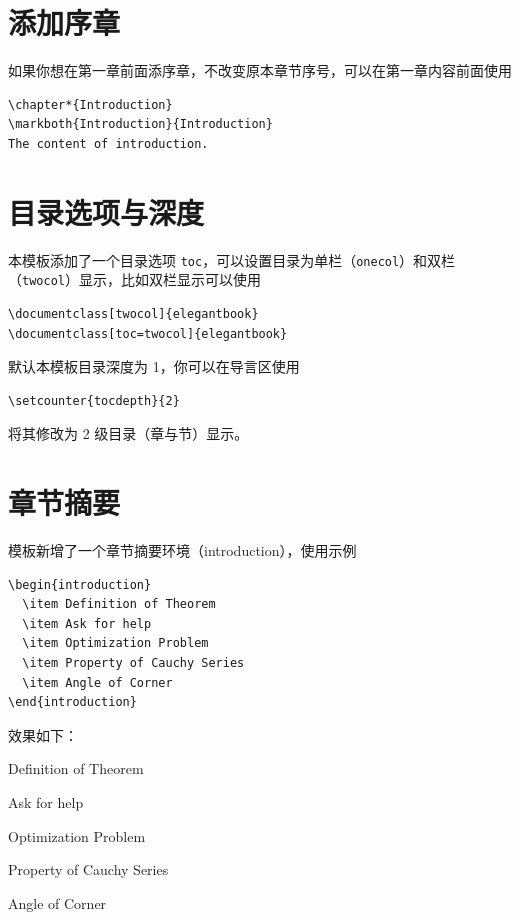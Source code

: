 \documentclass[lang=cn,newtx,10pt,scheme=chinese]{elegantbook}
\begin{document}
\section{添加序章}

如果你想在第一章前面添序章，不改变原本章节序号，可以在第一章内容前面使用 
\begin{lstlisting}
\chapter*{Introduction}
\markboth{Introduction}{Introduction}
The content of introduction.
\end{lstlisting}

\section{目录选项与深度}
本模板添加了一个目录选项 \lstinline{toc}，可以设置目录为单栏（\lstinline{onecol}）和双栏（\lstinline{twocol}）显示，比如双栏显示可以使用
\begin{lstlisting}
\documentclass[twocol]{elegantbook}
\documentclass[toc=twocol]{elegantbook}
\end{lstlisting}

默认本模板目录深度为 1，你可以在导言区使用
\begin{lstlisting}
\setcounter{tocdepth}{2}
\end{lstlisting}
将其修改为 2 级目录（章与节）显示。


\section{章节摘要}
模板新增了一个章节摘要环境（introduction），使用示例
\begin{lstlisting}
\begin{introduction}
  \item Definition of Theorem
  \item Ask for help
  \item Optimization Problem
  \item Property of Cauchy Series
  \item Angle of Corner
\end{introduction}
\end{lstlisting}
效果如下：
\begin{introduction}
  \item Definition of Theorem
  \item Ask for help
  \item Optimization Problem
  \item Property of Cauchy Series
  \item Angle of Corner
\end{introduction}
\end{document}
